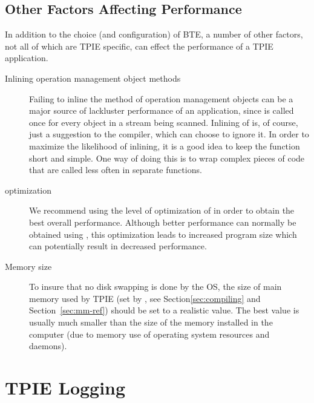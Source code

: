\subsection{Other Factors Affecting Performance}

In addition to the choice (and configuration) of BTE, a number of other
factors, not all of which are TPIE specific, can effect the performance of
a TPIE application.

\begin{description}
\item[Inlining operation management object methods] Failing to inline the
 method of operation management objects can be a major
source of lackluster performance of an application, since 
is called once for every object in a stream being scanned. Inlining of
 is, of course, just a suggestion to the compiler, which
can choose to ignore it. In order to maximize the likelihood of inlining,
it is a good idea to keep the function  short and simple. One way of
doing this is to wrap complex pieces of code that are called less often in
separate functions.
\item[ optimization] We recommend using the  level of
optimization of  in order to obtain the best overall
performance. Although better performance can normally be obtained using
, this optimization leads to increased program size which can
potentially result in decreased performance.
\item[Memory size] To insure that no disk swapping is done by the OS, the
size of main memory used by TPIE (set by ,
see Section\ref{sec:compiling} and Section~\ref{sec:mm-ref}) should be set
to a realistic value. The best value is usually much smaller than the size
of the memory installed in the computer (due to memory use of operating
system resources and daemons).
\end{description}



\section{TPIE Logging}
\label{sec:logging}

